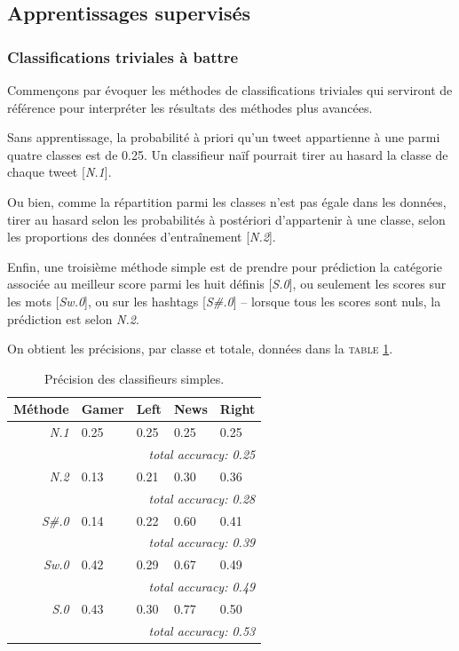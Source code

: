 \documentclass[twocolumn,10pt]{article}
\begin{document}
\subsection{Apprentissages supervisés}

\subsubsection{Classifications triviales à battre}

Commençons par évoquer les méthodes de classifications triviales qui serviront de référence pour interpréter les résultats des méthodes plus avancées.

Sans apprentissage, la probabilité à priori qu'un tweet appartienne à une parmi quatre classes est de 0.25. Un classifieur naïf pourrait tirer au hasard la classe de chaque tweet [\textit{N.1}].

Ou bien, comme la répartition parmi les classes n'est pas égale dans les données, tirer au hasard selon les probabilités à postériori d'appartenir à une classe, selon les proportions des données d'entraînement [\textit{N.2}].

Enfin, une troisième méthode simple est de prendre pour prédiction la catégorie associée au meilleur score parmi les huit définis [\textit{S.0}], ou seulement les scores sur les mots [\textit{Sw.0}], ou sur les hashtags [\textit{S\#.0}] -- lorsque tous les scores sont nuls, la prédiction est selon \textit{N.2}.

On obtient les précisions, par classe et totale, données dans la \textsc{table} \ref{tab:PCS}.

\begin{table}[h]
\begin{center}
\noindent\begin{tabular}{r|llll}
Méthode & Gamer & Left & News & Right \\ 
\hline 
\textit{N.1} & 0.25 & 0.25 & 0.25 & 0.25 \\
 & \multicolumn{4}{|r}{\textit{total accuracy: 0.25}} \\
\textit{N.2} & 0.13 & 0.21 & 0.30 & 0.36 \\
 & \multicolumn{4}{|r}{\textit{total accuracy: 0.28}} \\
 \textit{S\#.0} & 0.14 & 0.22 & 0.60 & 0.41 \\
 & \multicolumn{4}{|r}{\textit{total accuracy: 0.39}} \\
 \textit{Sw.0} & 0.42 & 0.29 & 0.67 & 0.49 \\
 & \multicolumn{4}{|r}{\textit{total accuracy: 0.49}} \\
 \textit{S.0} & 0.43 & 0.30 & 0.77 & 0.50 \\
 & \multicolumn{4}{|r}{\textit{total accuracy: 0.53}} \\
\end{tabular}
\caption{\label{tab:PCS} Précision des classifieurs simples.}
\end{center} 
\end{table}
\end{document}

